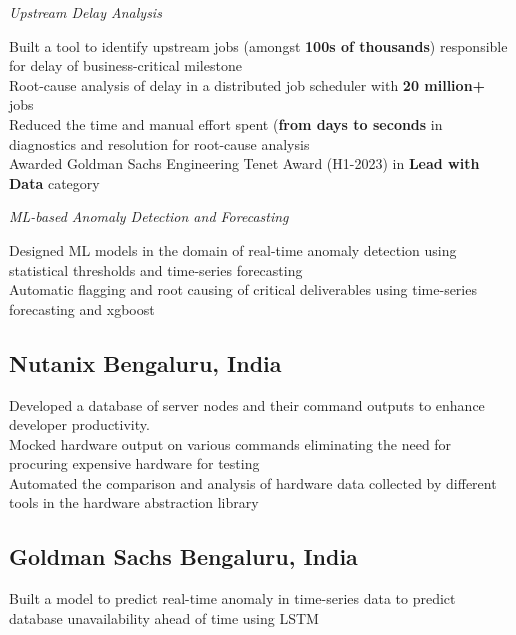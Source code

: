 \documentclass[a4paper]{Resume}
\begin{document}
\sectionsep{}


\textit{Upstream Delay Analysis}

\pt Built a tool to identify upstream jobs (amongst \textbf{100s of thousands}) responsible for delay of business-critical milestone \\
\pt Root-cause analysis of delay in a distributed job scheduler with \textbf{20 million+} jobs \\
\pt Reduced the time and manual effort spent (\textbf{from days to seconds} in diagnostics and resolution for root-cause analysis \\
\pt Awarded Goldman Sachs Engineering Tenet Award (H1-2023) in \textbf{Lead with Data} category \\

\sectionsep{}

\textit{ML-based Anomaly Detection and Forecasting}

\pt Designed ML models in the domain of real-time anomaly detection using statistical thresholds and time-series forecasting \\
\pt Automatic flagging and root causing of critical deliverables using time-series forecasting and xgboost \\

\sectionsep

\subsection{Nutanix \hfill \normalfont Bengaluru, India}
\pt Developed a database of server nodes and their command outputs to enhance developer productivity. \\
\pt Mocked hardware output on various commands eliminating the need for procuring expensive hardware for testing \\
\pt Automated the comparison and analysis of hardware data collected by different tools in the hardware abstraction library \\

\sectionsep

\subsection{Goldman Sachs \hfill \normalfont Bengaluru, India}
\pt Built a model to predict real-time anomaly in time-series data to predict database unavailability ahead of time using LSTM \\
\sectionsep
\end{document}
